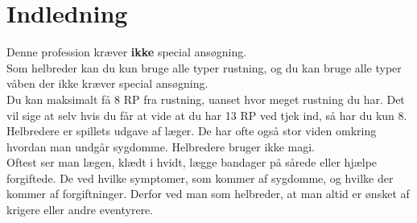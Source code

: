 \chapter{Indledning}

Denne profession kræver \textbf{ikke} special ansøgning.\\
Som helbreder kan du kun bruge alle typer rustning, og du kan bruge alle typer våben der ikke kræver special ansøgning.\\
Du kan maksimalt få 8 RP fra rustning, uanset hvor meget rustning du har. Det vil sige at selv hvis du får at vide at du har 13 RP ved tjek ind, så har du kun 8.\\

Helbredere er spillets udgave af læger. De har ofte også stor viden omkring hvordan man undgår sygdomme. Helbredere bruger ikke magi.\\ Oftest ser man lægen, klædt i hvidt,  lægge bandager på sårede eller hjælpe forgiftede. De ved hvilke symptomer, som kommer af sygdomme, og hvilke der kommer af forgiftninger. Derfor ved man som helbreder, at man altid er ønsket af krigere eller andre eventyrere.